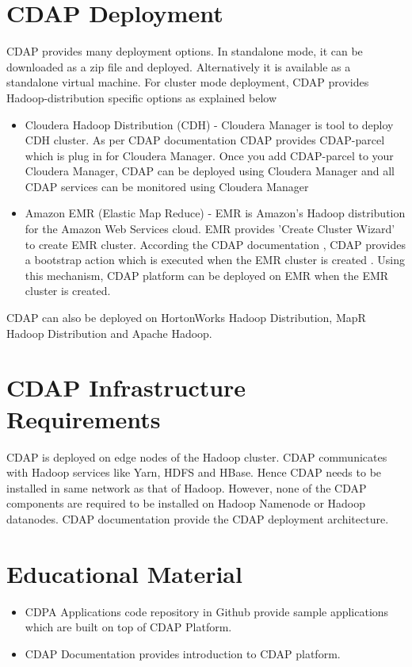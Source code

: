 \documentclass[9pt,twocolumn,twoside]{styles/osajnl}
\begin{document}
\section{CDAP Deployment}
CDAP provides many deployment options. In standalone mode, it can be
downloaded as a zip file and deployed.
Alternatively it is available as a standalone virtual machine.
For cluster mode deployment, CDAP provides Hadoop-distribution specific
options as explained below
\begin{itemize}
\item Cloudera Hadoop Distribution (CDH) - Cloudera Manager is tool to
 deploy CDH cluster. As per CDAP documentation
\cite{www-cdap-cloudera-manager} CDAP provides CDAP-parcel which is plug in for
Cloudera Manager. Once you add CDAP-parcel
to your Cloudera Manager, CDAP can be deployed using Cloudera Manager and all
 CDAP services can be monitored using Cloudera Manager
\item Amazon EMR (Elastic Map Reduce) - EMR is Amazon's Hadoop distribution
for the Amazon Web Services cloud. EMR provides 'Create Cluster Wizard' to
create EMR cluster. According the CDAP documentation \cite{www-cdap-emr}, CDAP
provides a bootstrap action which is executed when the EMR cluster is created
. Using this mechanism, CDAP platform can be deployed on EMR when the EMR
cluster is created.
\end{itemize}
CDAP can also be deployed on HortonWorks Hadoop Distribution, MapR Hadoop
Distribution and Apache Hadoop.



\section{CDAP Infrastructure Requirements}

CDAP is deployed on edge nodes of the Hadoop cluster. CDAP communicates with
Hadoop services like Yarn, HDFS and HBase. Hence CDAP needs to be installed
in same network as that of Hadoop. However, none of the CDAP components are
required to be installed on Hadoop Namenode or Hadoop datanodes. CDAP
documentation \cite{www-cdap-deployment} provide the CDAP deployment
architecture.

\section{Educational Material}

\begin{itemize}
\item CDPA Applications code repository in Github \cite{github-cdap-apps}
provide sample applications which are built on top of CDAP Platform.
\item CDAP Documentation \cite{www-cdap-getting-started} provides introduction
 to CDAP platform.
\end{itemize}
\end{document}
